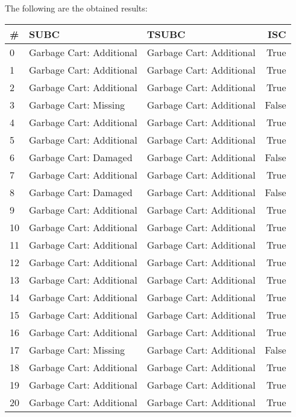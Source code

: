 The following are the obtained results:
\begin{center}
      \begin{tabular}{lllr}
            \toprule
            \# & SUBC                     & TSUBC                    & ISC   \\
            \midrule
            0  & Garbage Cart: Additional & Garbage Cart: Additional & True  \\
            1  & Garbage Cart: Additional & Garbage Cart: Additional & True  \\
            2  & Garbage Cart: Additional & Garbage Cart: Additional & True  \\
            3  & Garbage Cart: Missing    & Garbage Cart: Additional & False \\
            4  & Garbage Cart: Additional & Garbage Cart: Additional & True  \\
            5  & Garbage Cart: Additional & Garbage Cart: Additional & True  \\
            6  & Garbage Cart: Damaged    & Garbage Cart: Additional & False \\
            7  & Garbage Cart: Additional & Garbage Cart: Additional & True  \\
            8  & Garbage Cart: Damaged    & Garbage Cart: Additional & False \\
            9  & Garbage Cart: Additional & Garbage Cart: Additional & True  \\
            10 & Garbage Cart: Additional & Garbage Cart: Additional & True  \\
            11 & Garbage Cart: Additional & Garbage Cart: Additional & True  \\
            12 & Garbage Cart: Additional & Garbage Cart: Additional & True  \\
            13 & Garbage Cart: Additional & Garbage Cart: Additional & True  \\
            14 & Garbage Cart: Additional & Garbage Cart: Additional & True  \\
            15 & Garbage Cart: Additional & Garbage Cart: Additional & True  \\
            16 & Garbage Cart: Additional & Garbage Cart: Additional & True  \\
            17 & Garbage Cart: Missing    & Garbage Cart: Additional & False \\
            18 & Garbage Cart: Additional & Garbage Cart: Additional & True  \\
            19 & Garbage Cart: Additional & Garbage Cart: Additional & True  \\
            20 & Garbage Cart: Additional & Garbage Cart: Additional & True  \\
            \bottomrule
      \end{tabular}
\end{center}

